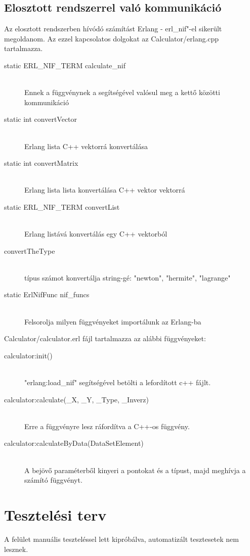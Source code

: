 \subsection{Elosztott rendszerrel való kommunikáció}
	Az elosztott rendszerben hívódó számítást Erlang - erl\_nif"-el sikerült megoldanom. 
	Az ezzel kapcsolatos dolgokat az Calculator/erlang.cpp tartalmazza.
	\begin{description}
		\item[static ERL\_NIF\_TERM calculate\_nif] \hfill \\
		Ennek a függvénynek a segítségével valósul meg a kettő közötti kommunikáció
		\item[static int convertVector] \hfill \\
		Erlang lista C++ vektorrá konvertálása
		\item[static int convertMatrix] \hfill \\
		Erlang lista lista konvertálása C++ vektor vektorrá
		\item[static ERL\_NIF\_TERM convertList] \hfill \\
		Erlang listává konvertálás egy C++ vektorból
		\item[convertTheType] \hfill \\
			típus számot konvertálja string-gé: 
			"newton", "hermite", "lagrange"
		\item[static ErlNifFunc nif\_funcs] \hfill \\
			Felsorolja milyen függvényeket importálunk az Erlang-ba
	\end{description}
	Calculator/calculator.erl fájl tartalmazza az alábbi függvényeket: 
	\begin{description}
		\item[calculator:init()] \hfill \\
			"erlang:load\_nif" segítségével betölti a lefordított c++ fájlt.
		\item[calculator:calculate(\_X, \_Y, \_Type, \_Inverz)] \hfill \\
			Erre a függvényre lesz ráfordítva a C++-os függvény.
		\item[calculator:calculateByData(DataSetElement)] \hfill \\
		A bejövő paraméterből kinyeri a pontokat és a típust, majd meghívja a számító függvényt.
	\end{description}


\section{Tesztelési terv}
	A felület manuális teszteléssel lett kipróbálva, automatizált tesztesetek nem lesznek.
